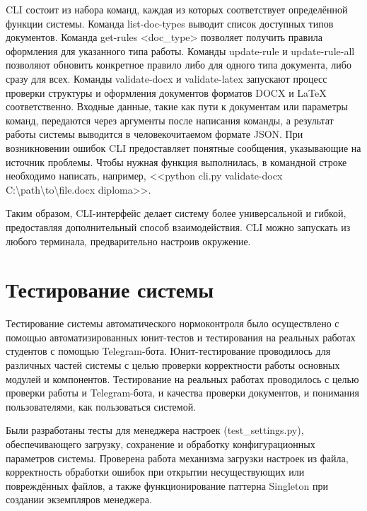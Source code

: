 \documentclass{report}
\begin{document}
CLI состоит из набора команд, каждая из которых соответствует определённой функции системы. Команда list-doc-types выводит список доступных типов документов. Команда get-rules <doc\_type> позволяет получить правила оформления для указанного типа работы. Команды update-rule и update-rule-all позволяют обновить конкретное правило либо для одного типа документа, либо сразу для всех. Команды validate-docx и validate-latex запускают процесс проверки структуры и оформления документов форматов DOCX и LaTeX соответственно. Входные данные, такие как пути к документам или параметры команд, передаются через аргументы после написания команды, а результат работы системы выводится в человекочитаемом формате JSON. При возникновении ошибок CLI предоставляет понятные сообщения, указывающие на источник проблемы. Чтобы нужная функция выполнилась, в командной строке необходимо написать, например, <<python cli.py \break validate-docx C:\textbackslash path\textbackslash to\textbackslash file.docx diploma>>.

Таким образом, CLI-интерфейс делает систему более универсальной и гибкой, предоставляя дополнительный способ взаимодействия. CLI можно запускать из любого терминала, предварительно настроив окружение.


\section{Тестирование системы} %

Тестирование системы автоматического нормоконтроля было осуществлено с помощью автоматизированных юнит-тестов и тестирования на реальных работах студентов с помощью Telegram-бота. Юнит-тестирование проводилось для различных частей системы с целью проверки корректности работы основных модулей и компонентов. Тестирование на реальных работах проводилось с целью проверки работы и Telegram-бота, и качества проверки документов, и понимания пользователями, как пользоваться системой.

Были разработаны тесты для менеджера настроек (test\_settings.py), обеспечивающего загрузку, сохранение и обработку конфигурационных параметров системы. Проверена работа механизма загрузки настроек из файла, корректность обработки ошибок при открытии несуществующих или повреждённых файлов, а также функционирование паттерна Singleton при создании экземпляров менеджера.
\end{document}
